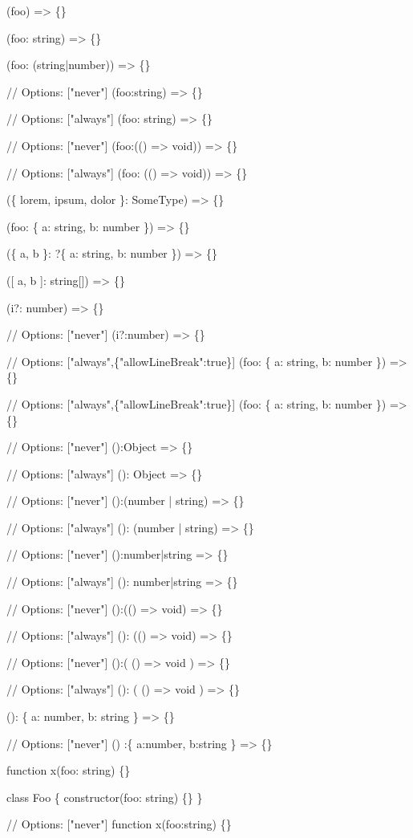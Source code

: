 \begin{DoxyCode}
(foo) => \{\}

(foo: string) => \{\}

(foo: (string|number)) => \{\}

// Options: ["never"]
(foo:string) => \{\}

// Options: ["always"]
(foo: string) => \{\}

// Options: ["never"]
(foo:(() => void)) => \{\}

// Options: ["always"]
(foo: (() => void)) => \{\}

(\{ lorem, ipsum, dolor \}: SomeType) => \{\}

(foo: \{ a: string, b: number \}) => \{\}

(\{ a, b \}: ?\{ a: string, b: number \}) => \{\}

([ a, b ]: string[]) => \{\}

(i?: number) => \{\}

// Options: ["never"]
(i?:number) => \{\}

// Options: ["always",\{"allowLineBreak":true\}]
(foo:
  \{ a: string, b: number \}) => \{\}

// Options: ["always",\{"allowLineBreak":true\}]
(foo:
  \{ a: string, b: number \}) => \{\}

// Options: ["never"]
():Object => \{\}

// Options: ["always"]
(): Object => \{\}

// Options: ["never"]
():(number | string) => \{\}

// Options: ["always"]
(): (number | string) => \{\}

// Options: ["never"]
():number|string => \{\}

// Options: ["always"]
(): number|string => \{\}

// Options: ["never"]
():(() => void) => \{\}

// Options: ["always"]
(): (() => void) => \{\}

// Options: ["never"]
():( () => void ) => \{\}

// Options: ["always"]
(): ( () => void ) => \{\}

(): \{ a: number, b: string \} => \{\}

// Options: ["never"]
() :\{ a:number, b:string \} => \{\}

function x(foo: string) \{\}

class Foo \{ constructor(foo: string) \{\} \}

// Options: ["never"]
function x(foo:string) \{\}


\end{DoxyCode}
